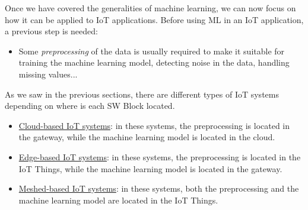 Once we have covered the generalities of machine learning, we can now focus on how it can be applied to IoT applications. Before using ML in an IoT application, a previous step is needed:
\begin{itemize}
    \item Some \emph{preprocessing} of the data is usually required to make it suitable for training the machine learning model, detecting noise in the data, handling missing values...
\end{itemize}

As we saw in the previous sections, there are different types of IoT systems depending on where is each SW Block located.
\begin{itemize}
    \item \ul{Cloud-based IoT systems}: in these systems, the preprocessing is located in the gateway, while the machine learning model is located in the cloud.
    \item \ul{Edge-based IoT systems}: in these systems, the preprocessing is located in the IoT Things, while the machine learning model is located in the gateway.
    \item \ul{Meshed-based IoT systems}: in these systems, both the preprocessing and the machine learning model are located in the IoT Things.
\end{itemize}

